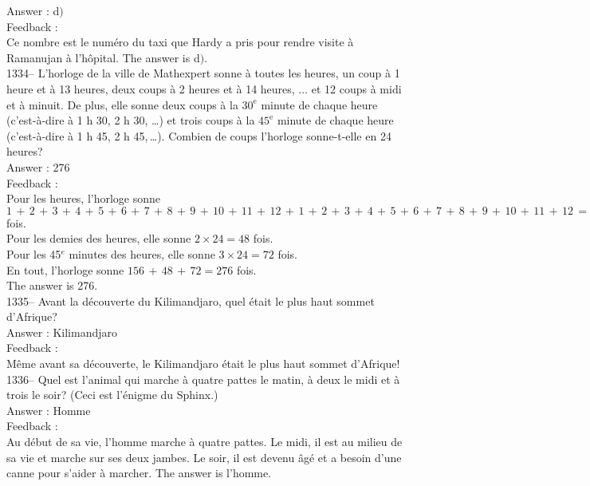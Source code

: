 ﻿\documentclass[letterpaper, 12pt]{article}
\begin{document}
Answer : d$)$\\

Feedback : \\
Ce nombre est le num\'ero du taxi que Hardy a pris pour rendre
visite \`a Ramanujan \`a l'h\^opital.
The answer is  d$)$.\\


1334-- L'horloge de la ville de Mathexpert sonne \`a toutes les heures, un
coup \`a 1 heure et \`a 13 heures, deux  coups \`a 2 heures et \`a 14
heures, $\ldots$ et 12 coups \`a midi et \`a minuit.  De plus, elle sonne
deux coups \`a la $30^{\textrm{e}}$ minute de chaque heure (c'est-\`a-dire
\`a 1 h 30, 2 h 30, \ldots) et trois coups \`a la $45^{\textrm{e}}$ minute
de chaque heure (c'est-\`a-dire \`a 1 h 45, 2 h 45,\,\ldots).  Combien de
coups l'horloge sonne-t-elle en 24 heures?\\

Answer : 276\\

Feedback :\\
Pour les heures, l'horloge sonne
$1\,+\,2\,+\,3\,+\,4\,+\,5\,+\,6\,+\,7\,+\,8\,+\,9\,+\,10\,+\,11\,+\,12\,+\,1\,+\,2\,+\,3\,+\,4\,+\,5\,+\,6\,+\,7\,+\,8\,+\,9\,+\,10\,+\,11\,+\,12\,=\,156$
fois.\\
Pour les demies des heures, elle sonne $2\times24=48$ fois.\\
Pour les 45$^e$ minutes des heures, elle sonne $3\times24=72$ fois.\\
En tout, l'horloge sonne $156\,+\,48\,+\,72=276$ fois.\\
The answer is 276.\\



1335-- Avant la d\'ecouverte du Kilimandjaro, quel \'etait le plus haut
sommet d'Afrique?\\

Answer : Kilimandjaro\\

Feedback : \\
M\^eme avant sa d\'ecouverte, le Kilimandjaro \'etait le plus haut sommet
d'Afrique!\\

1336-- Quel est l'animal qui marche \`a quatre pattes le matin, \`a deux le
midi et \`a trois le soir?  (Ceci est l'\'enigme du Sphinx.)\\

Answer : Homme\\

Feedback : \\
Au d\'ebut de sa vie, l'homme marche \`a quatre pattes.  Le midi, il est au
milieu de sa vie et marche sur ses deux jambes.  Le soir, il est devenu
\^ag\'e et a besoin d'une canne pour s'aider \`a marcher.  The answer is
l'homme.\\
\end{document}
